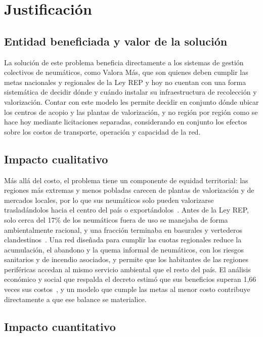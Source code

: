 \documentclass[letterpaper]{article}
\begin{document}
\section{Justificación}

\subsection*{Entidad beneficiada y valor de la solución}

La solución de este problema beneficia directamente a los sistemas de gestión colectivos de neumáticos, como Valora Más, que son quienes deben cumplir las metas nacionales y regionales de la Ley REP y hoy no cuentan con una forma sistemática de decidir dónde y cuándo instalar su infraestructura de recolección y valorización. Contar con este modelo les permite decidir en conjunto dónde ubicar los centros de acopio y las plantas de valorización, y no región por región como se hace hoy mediante licitaciones separadas, considerando en conjunto los efectos sobre los costos de transporte, operación y capacidad de la red.

\subsection*{Impacto cualitativo}

Más allá del costo, el problema tiene un componente de equidad territorial: las regiones más extremas y menos pobladas carecen de plantas de valorización y de mercados locales, por lo que sus neumáticos solo pueden valorizarse trasladándolos hacia el centro del país o exportándolos~\cite{paiscircular2026}. Antes de la Ley REP, solo cerca del 17\% de los neumáticos fuera de uso se manejaba de forma ambientalmente racional, y una fracción terminaba en basurales y vertederos clandestinos~\cite{DS8}. Una red diseñada para cumplir las cuotas regionales reduce la acumulación, el abandono y la quema informal de neumáticos, con los riesgos sanitarios y de incendio asociados, y permite que los habitantes de las regiones periféricas accedan al mismo servicio ambiental que el resto del país. El análisis económico y social que respalda el decreto estimó que sus beneficios superan 1,66 veces sus costos~\cite{DS8}, y un modelo que cumple las metas al menor costo contribuye directamente a que ese balance se materialice.

\subsection*{Impacto cuantitativo}
\end{document}
